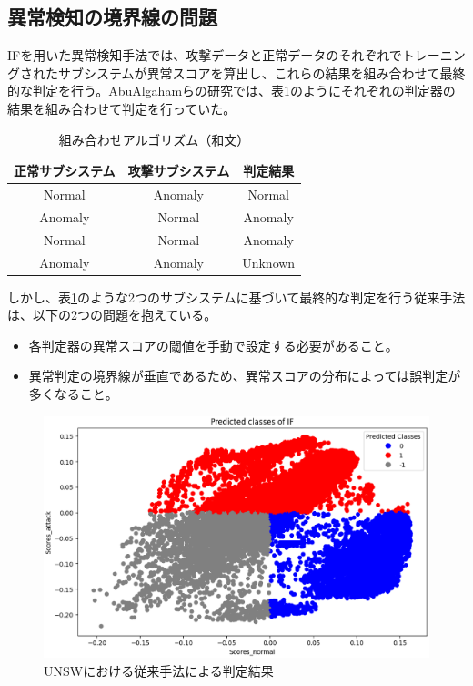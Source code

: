 \documentclass{css}
\begin{document}
\subsection{異常検知の境界線の問題}
IFを用いた異常検知手法では、攻撃データと正常データのそれぞれでトレーニングされたサブシステムが異常スコアを算出し、これらの結果を組み合わせて最終的な判定を行う。AbuAlgahamらの研究では、表\ref{tab:combination}のようにそれぞれの判定器の結果を組み合わせて判定を行っていた。

\begin{table}[ht]
    \caption{組み合わせアルゴリズム（和文）}
    \centering
    \footnotesize
    \begin{tabular}{ccc}
        \hline
        正常サブシステム & 攻撃サブシステム & 判定結果\\
        \hline
        Normal & Anomaly & Normal \\
        Anomaly & Normal & Anomaly \\
        Normal & Normal & Anomaly \\
        Anomaly & Anomaly & Unknown \\
        \hline
    \end{tabular}
    \label{tab:combination}
\end{table}

しかし、表\ref{tab:combination}のような2つのサブシステムに基づいて最終的な判定を行う従来手法は、以下の2つの問題を抱えている。
\begin{itemize}
    \item 各判定器の異常スコアの閾値を手動で設定する必要があること。
    \item 異常判定の境界線が垂直であるため、異常スコアの分布によっては誤判定が多くなること。
\end{itemize}

\begin{figure}[ht]
    \centering
    \includegraphics[width=\linewidth]{pictures/eps/UNSW2.eps}
    \caption{UNSWにおける従来手法による判定結果}
    \label{fig:UNSW2}
\end{figure}
\end{document}

